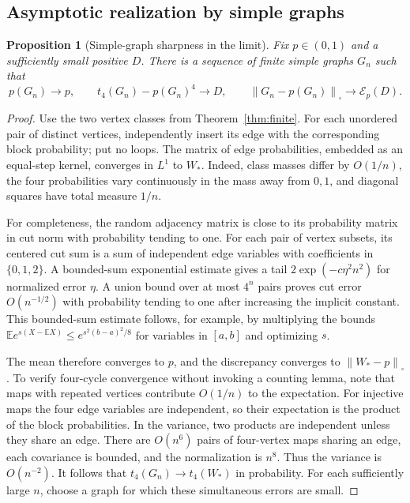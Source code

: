 \documentclass[11pt]{article}
\newtheorem{proposition}[theorem]{Proposition}
\theoremstyle{definition}
\newcommand{\E}{\mathbb E}
\newcommand{\1}{\mathbf 1}
\newcommand{\Cut}[1]{\left\|#1\right\|_{\square}}
\newcommand{\calE}{\mathcal E}
\begin{document}
\subsection{Asymptotic realization by simple graphs}
\begin{proposition}[Simple-graph sharpness in the limit]\label{prop:simple}
Fix $p\in(0,1)$ and a sufficiently small positive $D$. There is a sequence of finite simple graphs $G_n$ such that
\[
 p(G_n)\to p,\qquad t_4(G_n)-p(G_n)^4\to D,
 \qquad \Cut{G_n-p(G_n)}\to\calE_p(D).
\]
\end{proposition}
\begin{proof}
Use the two vertex classes from Theorem~\ref{thm:finite}. For each unordered pair of distinct vertices, independently insert its edge with the corresponding block probability; put no loops. The matrix of edge probabilities, embedded as an equal-step kernel, converges in $L^1$ to $W_*$. Indeed, class masses differ by $O(1/n)$, the four probabilities vary continuously in the mass away from $0,1$, and diagonal squares have total measure $1/n$.

For completeness, the random adjacency matrix is close to its probability matrix in cut norm with probability tending to one. For each pair of vertex subsets, its centered cut sum is a sum of independent edge variables with coefficients in $\{0,1,2\}$. A bounded-sum exponential estimate gives a tail $2\exp(-c\eta^2n^2)$ for normalized error $\eta$. A union bound over at most $4^n$ pairs proves cut error $O(n^{-1/2})$ with probability tending to one after increasing the implicit constant. This bounded-sum estimate follows, for example, by multiplying the bounds $\E e^{s(X-\E X)}\le e^{s^2(b-a)^2/8}$ for variables in $[a,b]$ and optimizing $s$.

The mean therefore converges to $p$, and the discrepancy converges to $\Cut{W_*-p}$. To verify four-cycle convergence without invoking a counting lemma, note that maps with repeated vertices contribute $O(1/n)$ to the expectation. For injective maps the four edge variables are independent, so their expectation is the product of the block probabilities. In the variance, two products are independent unless they share an edge. There are $O(n^6)$ pairs of four-vertex maps sharing an edge, each covariance is bounded, and the normalization is $n^8$. Thus the variance is $O(n^{-2})$. It follows that $t_4(G_n)\to t_4(W_*)$ in probability. For each sufficiently large $n$, choose a graph for which these simultaneous errors are small.
\end{proof}
\end{document}
